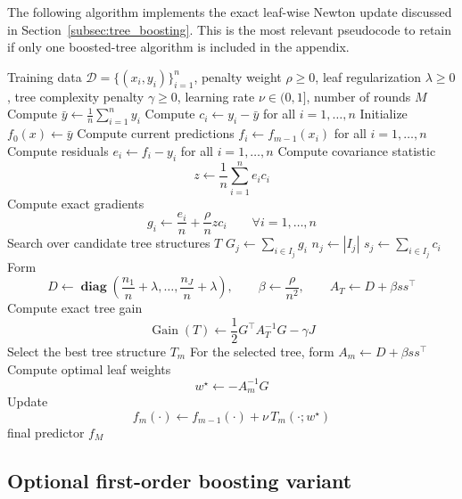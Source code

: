 \documentclass[12pt, draft]{article}
\theoremstyle{plain}
\theoremstyle{definition}
\newcommand{\1}{\mathbf{1}}
\newcommand{\D}{\mathcal{D}}
\newcommand{\diag}{\mathbf{\operatorname{diag}}}
\begin{document}
The following algorithm implements the exact leaf-wise Newton update discussed in Section~\ref{subsec:tree_boosting}. This is the most relevant pseudocode to retain if only one boosted-tree algorithm is included in the appendix.

\begin{algorithm}[!ht]
\caption{Exact Newton-style tree boosting with squared covariance penalty}
\label{alg:exact_newton_cov_boosting}
\begin{algorithmic}[1]
\Require Training data $\D=\{(x_i,y_i)\}_{i=1}^n$, penalty weight $\rho \ge 0$, leaf regularization $\lambda \ge 0$, tree complexity penalty $\gamma \ge 0$, learning rate $\nu \in (0,1]$, number of rounds $M$
\State Compute $\bar y \gets \frac{1}{n}\sum_{i=1}^n y_i$
\State Compute $c_i \gets y_i-\bar y$ for all $i=1,\dots,n$
\State Initialize $f_0(x) \gets \bar y$
    \State Compute current predictions $f_i \gets f_{m-1}(x_i)$ for all $i=1,\dots,n$
    \State Compute residuals $e_i \gets f_i-y_i$ for all $i=1,\dots,n$
    \State Compute covariance statistic
    \[
    z \gets \frac{1}{n}\sum_{i=1}^n e_i c_i
    \]
    \State Compute exact gradients
    \[
    g_i \gets \frac{e_i}{n} + \frac{\rho}{n} z c_i
    \qquad \forall i=1,\dots,n
    \]
    \State Search over candidate tree structures $T$
            \State $G_j \gets \sum_{i\in I_j} g_i$
            \State $n_j \gets |I_j|$
            \State $s_j \gets \sum_{i\in I_j} c_i$
        \EndFor
        \State Form
        \[
        D \gets \diag\!\left(\frac{n_1}{n}+\lambda,\dots,\frac{n_J}{n}+\lambda\right),
        \qquad
        \beta \gets \frac{\rho}{n^2},
        \qquad
        A_T \gets D + \beta ss^\top
        \]
        \State Compute exact tree gain
        \[
        \operatorname{Gain}(T)
        \gets
        \frac{1}{2}G^\top A_T^{-1}G - \gamma J
        \]
    \EndFor
    \State Select the best tree structure $T_m$
    \State For the selected tree, form $A_m \gets D + \beta ss^\top$
    \State Compute optimal leaf weights
    \[
    w^\star \gets -A_m^{-1}G
    \]
    \State Update
    \[
    f_m(\cdot) \gets f_{m-1}(\cdot) + \nu\,T_m(\cdot;w^\star)
    \]
\EndFor
\State \Return final predictor $f_M$
\end{algorithmic}
\end{algorithm}

\subsection{Optional first-order boosting variant}
\label{app:first_order_cov_boosting}
\end{document}
